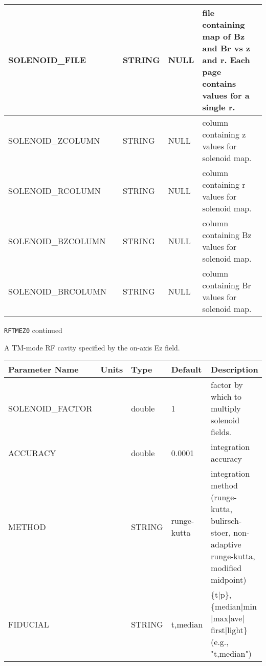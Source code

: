 \begin{tabular}{|l|l|l|l|p{\descwidth}|}
SOLENOID\_FILE &  & STRING &   NULL            & file containing map of Bz and Br vs z and r.  Each page contains values for a single r.  \\ \hline 
SOLENOID\_ZCOLUMN &  & STRING &   NULL            & column containing z values for solenoid map.  \\ \hline 
SOLENOID\_RCOLUMN &  & STRING &   NULL            & column containing r values for solenoid map.  \\ \hline 
SOLENOID\_BZCOLUMN &  & STRING &   NULL            & column containing Bz values for solenoid map.  \\ \hline 
SOLENOID\_BRCOLUMN &  & STRING &   NULL            & column containing Br values for solenoid map.  \\ \hline 
\end{tabular}

\begin{latexonly}
\newpage
\begin{center}{\Large\verb|RFTMEZ0| continued}\end{center}
\end{latexonly}
A TM-mode RF cavity specified by the on-axis Ez field.
\\
\begin{tabular}{|l|l|l|l|p{\descwidth}|} \hline
Parameter Name & Units & Type & Default & Description \\ \hline 
SOLENOID\_FACTOR &  & double &   1 & factor by which to multiply solenoid fields.  \\ \hline 
ACCURACY &  & double &   0.0001 & integration accuracy  \\ \hline 
METHOD & $ $ & STRING &   runge-kutta     & integration method (runge-kutta, bulirsch-stoer, non-adaptive runge-kutta, modified midpoint)  \\ \hline 
FIDUCIAL &  & STRING &   t,median        & \{t$|$p\},\{median$|$min$|$max$|$ave$|$first$|$light\} (e.g., "t,median")  \\ \hline 
\end{tabular}

